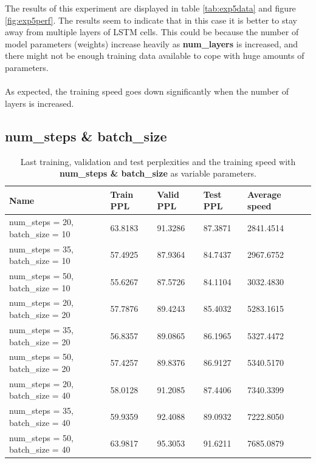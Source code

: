 \documentclass[10pt,a4paper,titlepage]{article}
\begin{document}
The results of this experiment are displayed in table \ref{tab:exp5data} and figure \ref{fig:exp5perf}. The results seem to indicate that in this case it is better to stay away from multiple layers of LSTM cells. This could be because the number of model parameters (weights) increase heavily as \textbf{num\_layers} is increased, and there might not be enough training data available to cope with huge amounts of parameters.\\
\\
As expected, the training speed goes down significantly when the number of layers is increased. 

\newpage

\subsection{num\_steps \& batch\_size}

\begin{table}[H]
\centering
\caption{Last training, validation and test perplexities and the training speed with \textbf{num\_steps \& batch\_size} as variable parameters.}
\label{tab:exp6data}
\begin{tabular}{|l|l|l|l|l|l|}
\hline
{\small Name} & {\small Train PPL} & {\small Valid PPL} & {\small Test PPL} & {\small Average speed}\\ \hline
{\small num\_steps = 20, batch\_size = 10}               & 63.8183    & 91.3286    & 87.3871    & 2841.4514  \\ \hline
{\small num\_steps = 35, batch\_size = 10}               & 57.4925    & 87.9364    & 84.7437    & 2967.6752  \\ \hline
{\small num\_steps = 50, batch\_size = 10}               & 55.6267    & 87.5726    & 84.1104    & 3032.4830  \\ \hline
{\small num\_steps = 20, batch\_size = 20}               & 57.7876    & 89.4243    & 85.4032    & 5283.1615  \\ \hline
{\small num\_steps = 35, batch\_size = 20}               & 56.8357    & 89.0865    & 86.1965    & 5327.4472  \\ \hline
{\small num\_steps = 50, batch\_size = 20}               & 57.4257    & 89.8376    & 86.9127    & 5340.5170  \\ \hline
{\small num\_steps = 20, batch\_size = 40}               & 58.0128    & 91.2085    & 87.4406    & 7340.3399  \\ \hline
{\small num\_steps = 35, batch\_size = 40}               & 59.9359    & 92.4088    & 89.0932    & 7222.8050  \\ \hline
{\small num\_steps = 50, batch\_size = 40}               & 63.9817    & 95.3053    & 91.6211    & 7685.0879  \\ \hline
\end{tabular}
\end{table}
\end{document}
